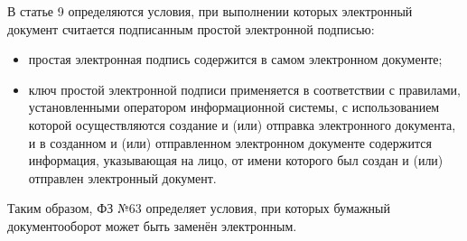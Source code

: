 В статье 9 определяются условия, при выполнении которых электронный документ считается подписанным простой электронной подписью:
\begin{itemize}
	\item простая электронная подпись содержится в самом электронном документе;
	\item ключ простой электронной подписи применяется в соответствии с правилами, установленными оператором информационной системы, с использованием которой осуществляются создание и (или) отправка электронного документа, и в созданном и (или) отправленном электронном документе содержится информация, указывающая на лицо, от имени которого был создан и (или) отправлен электронный документ.
\end{itemize}

Таким образом, ФЗ №63 определяет условия, при которых бумажный документооборот может быть заменён электронным.